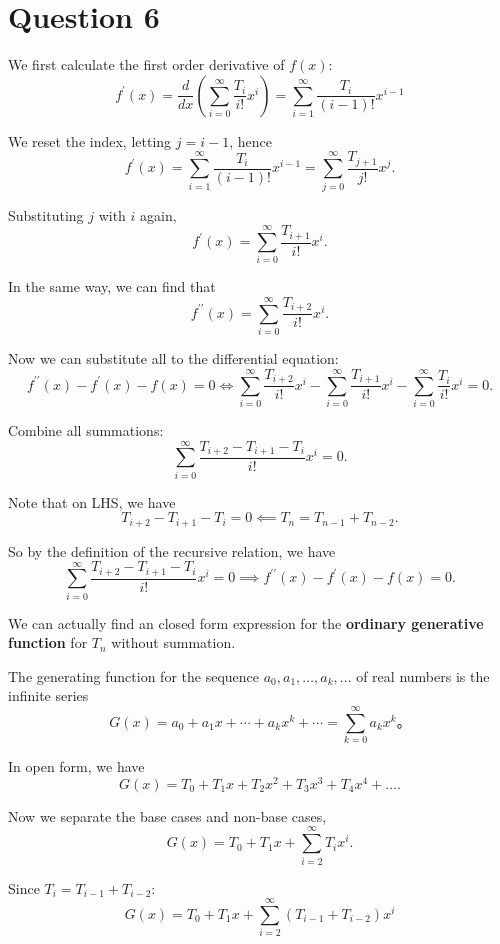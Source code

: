 \documentclass[12pt,a4paper]{article}
\begin{document}
\section*{Question 6}
\begin{solution}
We first calculate the first order derivative of $f(x)$:
\[
f^{\prime}(x)=\frac{d}{d x}\left(\sum_{i=0}^{\infty} \frac{T_i}{i!} x^i\right)=\sum_{i=1}^{\infty} \frac{T_i}{(i-1)!} x^{i-1}
\]

We reset the index, letting $j=i-1$, hence
\[
f^{\prime}(x) = \sum_{i=1}^{\infty} \frac{T_i}{(i-1)!} x^{i-1} =\sum_{j=0}^{\infty} \frac{T_{j+1}}{j!} x^j.
\]

Substituting $j$ with $i$ again,
\[
f^{\prime}(x) = \sum_{i=0}^{\infty} \frac{T_{i+1}}{i!} x^i.
\]

In the same way, we can find that
\[
f^{\prime \prime}(x)=\sum_{i=0}^{\infty} \frac{T_{i+2}}{i!} x^i.
\]

Now we can substitute all to the differential equation:
\[
f^{\prime \prime}(x)-f^{\prime}(x)-f(x) = 0 \iff
\sum_{i=0}^{\infty} \frac{T_{i+2}}{i!} x^i - \sum_{i=0}^{\infty} \frac{T_{i+1}}{i!} x^i
- \sum_{i=0}^{\infty} \frac{T_i}{i!} x^i = 0.
\]

Combine all summations:
\[
\sum_{i=0}^{\infty}\frac{T_{i+2}-T_{i+1}-T_{i}}{i!}x^i = 0.
\]

Note that on LHS, we have 
\[
T_{i+2}-T_{i+1}-T_{i} = 0 \impliedby T_n = T_{n-1} + T_{n-2}.
\]

So by the definition of the recursive relation, we have
\[
\sum_{i=0}^{\infty}\frac{T_{i+2}-T_{i+1}-T_{i}}{i!}x^i = 0
\implies
f^{\prime \prime}(x)-f^{\prime}(x)-f(x)=0.
\]

\begin{remark}
We can actually find an closed form expression for the \textbf{ordinary generative function} for $T_n$ without summation. 
\begin{definition}
The generating function for the sequence $a_0, a_1, \ldots, a_k, \ldots$ of real numbers is the infinite series
$$
G(x)=a_0+a_1 x+\cdots+a_k x^k+\cdots=\sum_{k=0}^{\infty} a_k x^k。
$$
\end{definition}

In open form, we have
\[
G(x)=T_0+T_1 x+T_2 x^2+T_3 x^3+T_4 x^4+\ldots.
\]

Now we separate the base cases and non-base cases,
\[
G(x)=T_0+T_1 x+\sum_{i=2}^{\infty} T_i x^i.
\]

Since $T_i = T_{i-1} + T_{i-2}$:
\[
G(x)=T_0+T_1 x+\sum_{i=2}^{\infty}\left(T_{i-1}+T_{i-2}\right) x^i
\]


\end{remark}
\end{solution}
\end{document}

